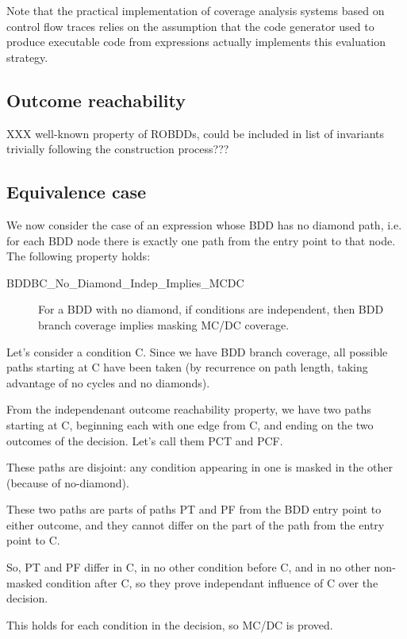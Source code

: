\documentclass[a4paper,12pt,twoside]{article}
\begin{document}
Note that the practical implementation of coverage analysis systems based
on control flow traces relies on the assumption that the code generator
used to produce executable code from expressions actually implements this
evaluation strategy.

\subsection{Outcome reachability}

XXX well-known property of ROBDDs, could be included in list
of invariants trivially following the construction process???

\subsection{Equivalence case}

We now consider the case of an expression whose BDD has no diamond path,
i.e. for each BDD node there is exactly one path from the entry point to
that node. The following property holds:

\begin{description}
\item[BDDBC\_No\_Diamond\_Indep\_Implies\_MCDC]
  For a BDD with no diamond, if conditions are independent, then
  BDD branch coverage implies masking MC/DC coverage.
\end{description}

Let's consider a condition C. Since we have BDD branch coverage,
all possible paths starting at C have been taken (by recurrence on path
length, taking advantage of no cycles and no diamonds).

From the independenant outcome reachability property, we have two paths
starting at C, beginning each with one edge from C, and ending on the
two outcomes of the decision. Let's call them PCT and PCF.

These paths are disjoint: any condition appearing in one is masked
in the other (because of no-diamond).

These two paths are parts of paths PT and PF from the BDD entry point to
either outcome, and they cannot differ on the part of the path from the
entry point to C.

So, PT and PF differ in C, in no other condition before C, and in no
other non-masked condition after C, so they prove independant influence
of C over the decision.

This holds for each condition in the decision, so MC/DC is proved.
\end{document}
